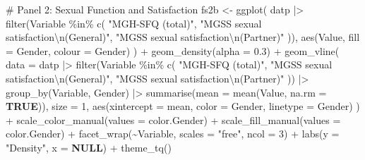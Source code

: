 \documentclass[
  bookmarksnumbered]{article}
\newenvironment{Shaded}{\begin{snugshade}}{\end{snugshade}}
\newcommand{\AttributeTok}[1]{\textcolor[rgb]{0.80,0.80,0.80}{#1}}
\newcommand{\CommentTok}[1]{\textcolor[rgb]{0.50,0.62,0.50}{#1}}
\newcommand{\ConstantTok}[1]{\textcolor[rgb]{0.86,0.64,0.64}{\textbf{#1}}}
\newcommand{\DecValTok}[1]{\textcolor[rgb]{0.86,0.86,0.80}{#1}}
\newcommand{\FloatTok}[1]{\textcolor[rgb]{0.75,0.75,0.82}{#1}}
\newcommand{\FunctionTok}[1]{\textcolor[rgb]{0.94,0.94,0.56}{#1}}
\newcommand{\NormalTok}[1]{\textcolor[rgb]{0.80,0.80,0.80}{#1}}
\newcommand{\OtherTok}[1]{\textcolor[rgb]{0.94,0.94,0.56}{#1}}
\newcommand{\SpecialCharTok}[1]{\textcolor[rgb]{0.86,0.64,0.64}{#1}}
\newcommand{\StringTok}[1]{\textcolor[rgb]{0.80,0.58,0.58}{#1}}
\begin{document}
\begin{Shaded}
\begin{Highlighting}[]
\CommentTok{\# Panel 2: Sexual Function and Satisfaction}
\NormalTok{fs2b }\OtherTok{\textless{}{-}} \FunctionTok{ggplot}\NormalTok{(}
\NormalTok{  datp }\SpecialCharTok{|\textgreater{}} \FunctionTok{filter}\NormalTok{(Variable }\SpecialCharTok{\%in\%} \FunctionTok{c}\NormalTok{(}
    \StringTok{"MGH{-}SFQ (total)"}\NormalTok{, }\StringTok{"MGSS sexual satisfaction}\SpecialCharTok{\textbackslash{}n}\StringTok{(General)"}\NormalTok{,}
    \StringTok{"MGSS sexual satisfaction}\SpecialCharTok{\textbackslash{}n}\StringTok{(Partner)"}
\NormalTok{  )),}
  \FunctionTok{aes}\NormalTok{(Value, }\AttributeTok{fill =}\NormalTok{ Gender, }\AttributeTok{colour =}\NormalTok{ Gender)}
\NormalTok{) }\SpecialCharTok{+}
  \FunctionTok{geom\_density}\NormalTok{(}\AttributeTok{alpha =} \FloatTok{0.3}\NormalTok{) }\SpecialCharTok{+}
  \FunctionTok{geom\_vline}\NormalTok{(}
    \AttributeTok{data =}\NormalTok{ datp }\SpecialCharTok{|\textgreater{}}
      \FunctionTok{filter}\NormalTok{(Variable }\SpecialCharTok{\%in\%} \FunctionTok{c}\NormalTok{(}
        \StringTok{"MGH{-}SFQ (total)"}\NormalTok{, }\StringTok{"MGSS sexual satisfaction}\SpecialCharTok{\textbackslash{}n}\StringTok{(General)"}\NormalTok{,}
        \StringTok{"MGSS sexual satisfaction}\SpecialCharTok{\textbackslash{}n}\StringTok{(Partner)"}
\NormalTok{      )) }\SpecialCharTok{|\textgreater{}}
      \FunctionTok{group\_by}\NormalTok{(Variable, Gender) }\SpecialCharTok{|\textgreater{}}
      \FunctionTok{summarise}\NormalTok{(}\AttributeTok{mean =} \FunctionTok{mean}\NormalTok{(Value, }\AttributeTok{na.rm =} \ConstantTok{TRUE}\NormalTok{)),}
    \AttributeTok{size =} \DecValTok{1}\NormalTok{, }\FunctionTok{aes}\NormalTok{(}\AttributeTok{xintercept =}\NormalTok{ mean, }\AttributeTok{color =}\NormalTok{ Gender, }\AttributeTok{linetype =}\NormalTok{ Gender)}
\NormalTok{  ) }\SpecialCharTok{+}
  \FunctionTok{scale\_color\_manual}\NormalTok{(}\AttributeTok{values =}\NormalTok{ color.Gender) }\SpecialCharTok{+}
  \FunctionTok{scale\_fill\_manual}\NormalTok{(}\AttributeTok{values =}\NormalTok{ color.Gender) }\SpecialCharTok{+}
  \FunctionTok{facet\_wrap}\NormalTok{(}\SpecialCharTok{\textasciitilde{}}\NormalTok{Variable, }\AttributeTok{scales =} \StringTok{"free"}\NormalTok{, }\AttributeTok{ncol =} \DecValTok{3}\NormalTok{) }\SpecialCharTok{+}
  \FunctionTok{labs}\NormalTok{(}\AttributeTok{y =} \StringTok{"Density"}\NormalTok{, }\AttributeTok{x =} \ConstantTok{NULL}\NormalTok{) }\SpecialCharTok{+}
  \FunctionTok{theme\_tq}\NormalTok{()}


\end{Highlighting}
\end{Shaded}
\end{document}
